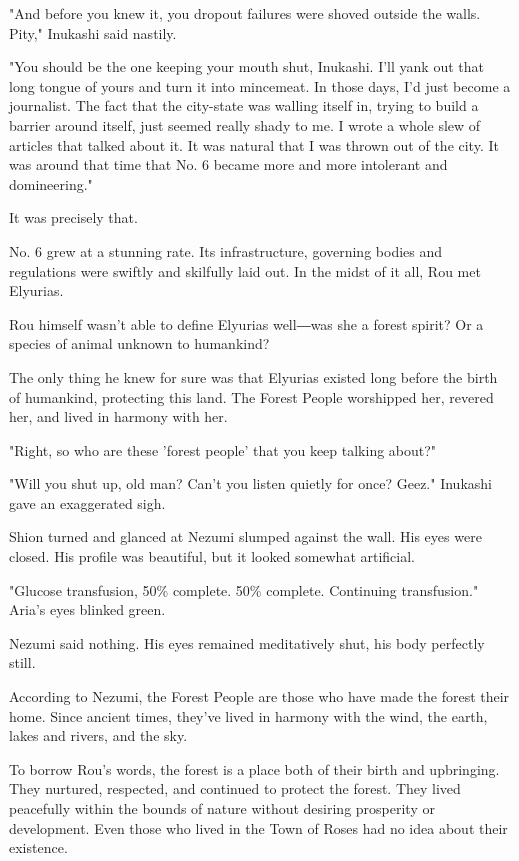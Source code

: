 "And before you knew it, you dropout failures were shoved outside the
walls. Pity," Inukashi said nastily.

"You should be the one keeping your mouth shut, Inukashi. I'll yank out
that long tongue of yours and turn it into mincemeat. In those days, I'd
just become a journalist. The fact that the city-state was walling
itself in, trying to build a barrier around itself, just seemed really
shady to me. I wrote a whole slew of articles that talked about it. It
was natural that I was thrown out of the city. It was around that time
that No. 6 became more and more intolerant and domineering."

It was precisely that.

No. 6 grew at a stunning rate. Its infrastructure, governing bodies and
regulations were swiftly and skilfully laid out. In the midst of it all,
Rou met Elyurias.

Rou himself wasn't able to define Elyurias well―was she a forest spirit?
Or a species of animal unknown to humankind?

The only thing he knew for sure was that Elyurias existed long before
the birth of humankind, protecting this land. The Forest People
worshipped her, revered her, and lived in harmony with her.

"Right, so who are these 'forest people' that you keep talking about?"

"Will you shut up, old man? Can't you listen quietly for once? Geez."
Inukashi gave an exaggerated sigh.

Shion turned and glanced at Nezumi slumped against the wall. His eyes
were closed. His profile was beautiful, but it looked somewhat
artificial.

"Glucose transfusion, 50\% complete. 50\% complete. Continuing
transfusion." Aria's eyes blinked green.

Nezumi said nothing. His eyes remained meditatively shut, his body
perfectly still.

According to Nezumi, the Forest People are those who have made the
forest their home. Since ancient times, they've lived in harmony with
the wind, the earth, lakes and rivers, and the sky.

To borrow Rou's words, the forest is a place both of their birth and
upbringing. They nurtured, respected, and continued to protect the
forest. They lived peacefully within the bounds of nature without
desiring prosperity or development. Even those who lived in the Town of
Roses had no idea about their existence.

